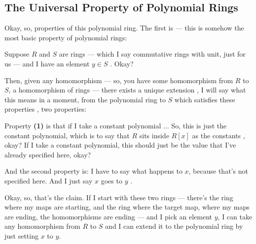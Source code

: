 \subsection{The Universal Property of Polynomial Rings}

\begin{speech}[00:06:30 - 00:09:00]
Okay, so, properties of this polynomial ring. The first is --- this is somehow the most basic property of polynomial rings:

Suppose $R$ and $S$ are rings  --- which I say commutative rings with unit, just for us --- and I have an element $y \in S$ . Okay?

Then, given any homomorphism  --- so, you have some homomorphism from $R$ to $S$, a homomorphism of rings --- there exists a unique extension , I will say what this means in a moment, from the polynomial ring to $S$  which satisfies these properties , two properties:

Property \textbf{(1)} is that if I take a constant polynomial ... So, this is just the constant polynomial, which is to say that $R$ sits inside $R[x]$ as the constants , okay? If I take a constant polynomial, this should just be the value that I've already specified here, okay?

And the second property is: I have to say what happens to $x$, because that's not specified here. And I just say $x$ goes to $y$ .

Okay, so, that's the claim. If I start with these two rings --- there's the ring where my maps are starting, and the ring where the target map, where my maps are ending, the homomorphisms are ending --- and I pick an element $y$, I can take any homomorphism from $R$ to $S$ and I can extend it to the polynomial ring by just setting $x$ to $y$.
\end{speech}

